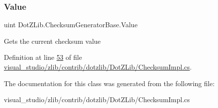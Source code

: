 \subsubsection{\texorpdfstring{Value}{Value}}
{\footnotesize\ttfamily uint Dot\+Z\+Lib.\+Checksum\+Generator\+Base.\+Value\hspace{0.3cm}{\ttfamily [get]}}



Gets the current checksum value 



Definition at line \hyperlink{visual__studio_2zlib_2contrib_2dotzlib_2_dot_z_lib_2_checksum_impl_8cs_source_l00053}{53} of file \hyperlink{visual__studio_2zlib_2contrib_2dotzlib_2_dot_z_lib_2_checksum_impl_8cs_source}{visual\+\_\+studio/zlib/contrib/dotzlib/\+Dot\+Z\+Lib/\+Checksum\+Impl.\+cs}.



The documentation for this class was generated from the following file\+:\begin{DoxyCompactItemize}
\item 
visual\+\_\+studio/zlib/contrib/dotzlib/\+Dot\+Z\+Lib/\+Checksum\+Impl.\+cs\end{DoxyCompactItemize}
